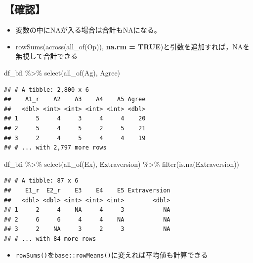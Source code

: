 \documentclass[
  xelatex,ja=standard, b5paper]{bxjsbook}
\newenvironment{Shaded}{\begin{snugshade}}{\end{snugshade}}
\newcommand{\FunctionTok}[1]{\textcolor[rgb]{0.00,0.00,0.00}{#1}}
\newcommand{\NormalTok}[1]{#1}
\newcommand{\SpecialCharTok}[1]{\textcolor[rgb]{0.00,0.00,0.00}{#1}}
\providecommand{\tightlist}{%
  \setlength{\itemsep}{0pt}\setlength{\parskip}{0pt}}
\begin{document}
\hypertarget{ux78baux8a8d}{%
\subsection{【確認】}\label{ux78baux8a8d}}

\begin{itemize}
\tightlist
\item
  変数の中にNAが入る場合は合計もNAになる。
\item
  rowSums(across(all\_of(Op)), \textbf{na.rm = TRUE})と引数を追加すれば，NAを無視して合計できる
\end{itemize}

\begin{Shaded}
\begin{Highlighting}[]
\NormalTok{df\_bfi }\SpecialCharTok{\%\textgreater{}\%} \FunctionTok{select}\NormalTok{(}\FunctionTok{all\_of}\NormalTok{(Ag), Agree)}
\end{Highlighting}
\end{Shaded}

\begin{verbatim}
## # A tibble: 2,800 x 6
##    A1_r    A2    A3    A4    A5 Agree
##   <dbl> <int> <int> <int> <int> <dbl>
## 1     5     4     3     4     4    20
## 2     5     4     5     2     5    21
## 3     2     4     5     4     4    19
## # ... with 2,797 more rows
\end{verbatim}

\begin{Shaded}
\begin{Highlighting}[]
\NormalTok{df\_bfi }\SpecialCharTok{\%\textgreater{}\%} 
  \FunctionTok{select}\NormalTok{(}\FunctionTok{all\_of}\NormalTok{(Ex), Extraversion) }\SpecialCharTok{\%\textgreater{}\%} 
  \FunctionTok{filter}\NormalTok{(}\FunctionTok{is.na}\NormalTok{(Extraversion))}
\end{Highlighting}
\end{Shaded}

\begin{verbatim}
## # A tibble: 87 x 6
##    E1_r  E2_r    E3    E4    E5 Extraversion
##   <dbl> <dbl> <int> <int> <int>        <dbl>
## 1     2     4    NA     4     3           NA
## 2     6     6     4     4    NA           NA
## 3     2    NA     3     2     3           NA
## # ... with 84 more rows
\end{verbatim}

\begin{itemize}
\tightlist
\item
  \texttt{rowSums()}を\texttt{base::rowMeans()}に変えれば平均値も計算できる
\end{itemize}
\end{document}
